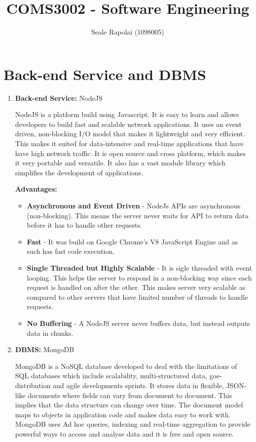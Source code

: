 \documentclass[12pt]{article}
\begin{document}
	\title{COMS3002 - Software Engineering}
	\author{Seale Rapolai (1098005)}
	\maketitle

	\section{Back-end Service and DBMS}
		\begin{enumerate}
			\item \textbf{Back-end Service:} NodeJS
			\begin{flushleft}
				NodeJS is a platform build using Javascript. It is easy to learn and allows developers to build fast and scalable network applications. It uses an event driven, non-blocking I/O model that makes it lightweight and very efficient. This makes it suited for data-intensive and real-time applications that have have high network traffic. It is open source and cross platform, which makes it very portable and versatile. It also has a vast module library which simplifies the development of applications.
				
			\end{flushleft}
			\textbf{Advantages:}
			\begin{itemize}
				\item \textbf{Asynchronous and Event Driven} - NodeJs APIs are asynchronous (non-blocking). This means the server never waits for API to return data before it has to handle other requests.
				\item \textbf{Fast} - It was build on Google Chrome's V8 JavaScript Engine and as such has fast code execution.
				\item \textbf{Single Threaded but Highly Scalable} - It is sigle threaded with event looping. This helps the server to respond in a non-blocking way since each request is handled on after the other. This makes server very scalable as compared to other servers that have limited number of threads to handle requests.
				\item \textbf{No Buffering} - A NodeJS server never buffers data, but instead outputs data in chunks.
			\end{itemize}
			
			\item \textbf{DBMS:} MongoDB
			\begin{flushleft}
				MongoDB is a NoSQL database developed to deal with the limitations of SQL databases which include scalability, multi-structured data, goe-distribution and agile developments sprints. It stores data in flexible, JSON-like documents where fields can vary from document to document. This implies that the data structure can change over time. The document model maps to objects in application code and makes data easy to work with. MongoDB uses Ad hoc queries, indexing and real-time aggregation to provide powerful ways to access and analyse data and it is free and open source.
			\end{flushleft}
		\end{enumerate}
\end{document}
